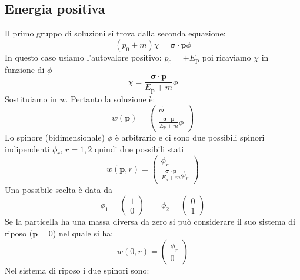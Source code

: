 \subsection{Energia positiva}
Il primo gruppo di soluzioni si trova dalla seconda equazione:
\begin{equation*}
    \left(p_0+m\right)\chi=\boldsymbol{\sigma}\cdot\mathbf{p}\phi
\end{equation*}
In questo caso usiamo l'autovalore positivo: $p_0=+E_\mathbf{p}$ poi ricaviamo $\chi$ in funzione di $\phi$
\begin{equation*}
    \chi=\frac{\boldsymbol{\sigma}\cdot\mathbf{p}}{E_\mathbf{p}+m}\phi
\end{equation*}
Sostituiamo in $w$. Pertanto la soluzione è:
\begin{equation*}
    w(\mathbf{p}) = \begin{pmatrix} \phi \\ \frac{\boldsymbol{\sigma} \cdot \mathbf{p}}{E_p + m} \phi \end{pmatrix}
\end{equation*}
Lo spinore (bidimensionale) $\phi$ è arbitrario e ci sono due possibili spinori indipendenti $\phi_r$, $r=1,2$ quindi due possibili stati
\begin{equation*}
    w(\mathbf{p}, r) = \begin{pmatrix} \phi_r \\ \frac{\boldsymbol{\sigma} \cdot \mathbf{p}}{E_p + m} \phi_r \end{pmatrix}
\end{equation*}
Una possibile scelta è data da
\begin{equation*}
    \phi_1=\begin{pmatrix}
        1\\0
    \end{pmatrix}\qquad \phi_2=\begin{pmatrix}
        0\\1
    \end{pmatrix}
\end{equation*}
Se la particella ha una massa diversa da zero si può considerare il suo sistema di riposo ($\mathbf{p}=0$) nel quale si ha:
\begin{equation*}
    w(0, r) = \begin{pmatrix} \phi_r \\ 0 \end{pmatrix}
\end{equation*}
Nel sistema di riposo i due spinori sono:
